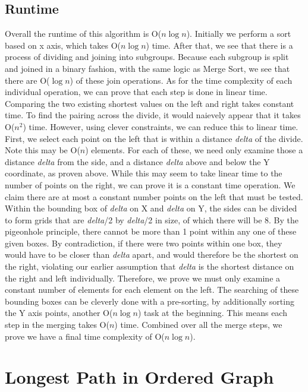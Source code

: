 \documentclass[titlepage]{article}
\numberwithin{equation}{subsection}
\begin{document}
\subsection{Runtime}
Overall the runtime of this algorithm is O($n\log n$). Initially we perform a sort based on x axis, which takes
O($n\log n$) time. After that, we see that there is a process of dividing and joining into subgroups. Because 
each subgroup is split and joined in a binary fashion, with the same logic as Merge Sort, we see that there 
are O($\log n$) of these join operations. As for the time complexity of each individual operation, we can prove that
each step is done in linear time. Comparing the two existing shortest values on the left and right takes constant
time. To find the pairing across the divide, it would naievely appear that it takes O($n^{2}$) time. However, using
clever constraints, we can reduce this to linear time. First, we select each point on the left that is within
a distance \textit{delta} of the divide. Note this may be O($n$) elements. For each of these, we need only examine
those a distance \textit{delta} from the side, and a distance \textit{delta} above and below the Y coordinate, as
proven above. While this may seem to take linear time to the number of points on the right, we can prove it is
a constant time operation. We claim there are at most a constant number points on the left that must be tested. 
Within the bounding box of \textit{delta} on X and \textit{delta} on Y, the sides can be divided to form grids
that are \textit{delta}/2 by \textit{delta}/2 in size, of which there will be 8. By the pigeonhole principle,
there cannot be more than 1 point within any one of these given boxes. By contradiction, if there were two points
within one box, they would have to be closer than \textit{delta} apart, and would therefore be the shortest on the
right, violating our earlier assumption that \textit{delta} is the shortest distance on the right and left individually.
Therefore, we prove we must only examine a constant number of elements for each element on the left. The searching
of these bounding boxes can be cleverly done with a pre-sorting, by additionally sorting the Y axis points, another
O($n\log n$) task at the beginning. This means each step in the merging takes O($n$) time. Combined over all the
merge steps, we prove we have a final time complexity of O($n\log n$).

\section{Longest Path in Ordered Graph}
\end{document}
